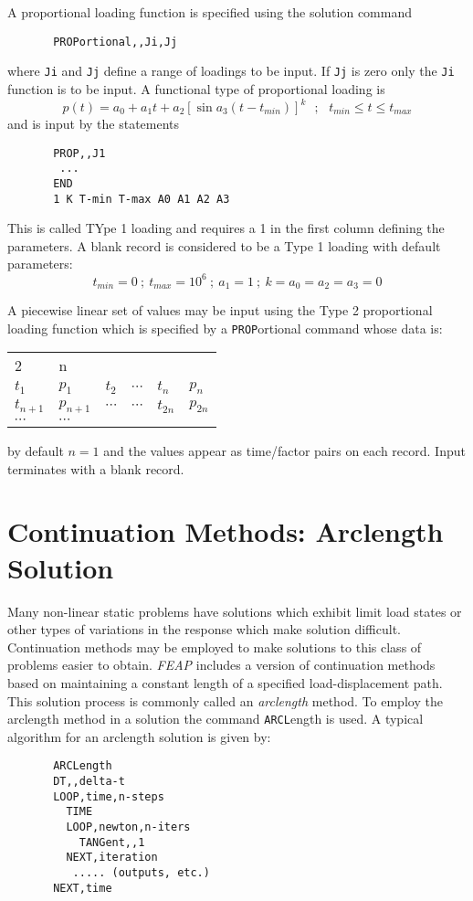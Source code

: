 A proportional loading function is specified using the solution command 
\begin{verbatim}
       PROPortional,,Ji,Jj
\end{verbatim}
where {\tt Ji} and {\tt Jj} define a range of loadings to be input.
If {\tt Jj} is zero only the {\tt Ji} function is to be input.
A functional type of proportional loading is
\begin{equation}
p(t) = a_0 + a_1 t + a_2 [ \sin a_3 (t - t_{min})]^k ~~~;~~~
t_{min} \le t \le t_{max}
\end{equation}
and is input by the statements
\begin{verbatim}
       PROP,,J1
        ...
       END
       1 K T-min T-max A0 A1 A2 A3
\end{verbatim}
This is called TYpe 1 loading and requires a 1 in the first column defining
the parameters.  A blank record is considered to be a Type 1 loading with
default parameters:
\begin{equation}
t_{min} = 0 ~;~ t_{max} = 10^{6} ~;~ a_1 = 1 ~;~ k = a_0 = a_2 = a_3 = 0
\end{equation}

A piecewise linear set of values may be input using the Type 2 proportional
loading function which is specified by a {\tt PROP}ortional command  whose
data is:
\begin{center}
\begin{tabular}{l l l l l l}
  2 & n \\
$t_1$ & $p_1$ & $t_2$ & $\cdots$ & $t_n$ & $p_n$ \\
$t_{n+1}$ & $p_{n+1}$ & $\cdots$ & $\cdots$ & $t_{2n}$ & $p_{2n}$ \\
$\cdots$ & $\cdots$ \\
\end{tabular}
\end{center}
by default $n = 1$ and the values appear as time/factor pairs on each record.
Input terminates with a blank record.

\section{Continuation Methods: Arclength Solution}

Many non-linear static problems have solutions which exhibit limit load
states or other types of variations in the response which make solution
difficult.  Continuation methods may be employed to make solutions to
this class of problems easier to obtain.  {\sl FEAP} includes a version
of continuation methods based on maintaining a constant length of a specified
load-displacement path.  This solution process is commonly called an {\it
arclength} method.  To employ the arclength method in a solution the
command {\tt ARCL}ength is used.  A typical algorithm for an arclength 
solution is given by:
\begin{verbatim}
       ARCLength
       DT,,delta-t
       LOOP,time,n-steps
         TIME
         LOOP,newton,n-iters
           TANGent,,1
         NEXT,iteration
          ..... (outputs, etc.)
       NEXT,time
\end{verbatim}

